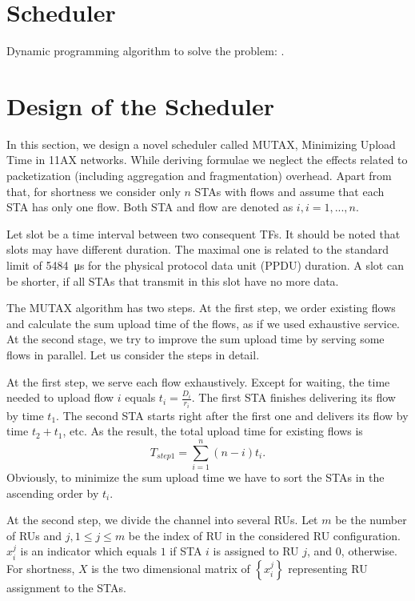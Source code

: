 \section{Scheduler}
Dynamic programming algorithm to solve the problem: \cite{bourgeois1971extension}.

\section{Design of the Scheduler}
\label{mutex}
In this section, we design a novel scheduler called MUTAX, Minimizing Upload Time in 11AX networks. While deriving formulae we neglect the effects related to packetization (including aggregation and fragmentation) overhead. Apart from that, for shortness we consider only $n$ STAs with flows and assume that each STA has only one flow. Both STA and flow are denoted as $i, i=1,...,n$.

Let slot be a time interval between two consequent TFs.
It should be noted that slots may have different duration.
The maximal one is related to the standard limit of \SI{5484}{\us} for the physical protocol data unit (PPDU) duration.
A slot can be shorter, if all STAs that transmit in this slot have no more data.

The MUTAX algorithm has two steps. At the first step, we order existing flows and calculate the sum upload time of the flows, as if we used exhaustive service.
At the second stage, we try to improve the sum upload time by serving some flows in parallel.
Let us consider the steps in detail.
  
At the first step, we serve each flow exhaustively.
Except for waiting, the time needed to upload flow $i$ equals $t_i = \frac{D_i}{r_{i}}$. %
The first STA finishes delivering its flow by time $t_1$.
The second STA starts right after the first one and delivers its flow by time $t_2 + t_1$, etc.
As the result, the total upload time for existing flows is
\begin{equation}
T_{step1} = \sum_{i = 1}^{n} \left(n - i\right) t_i. 
\end{equation}
Obviously, to minimize the sum upload time we have to sort the STAs in the ascending order by $t_i$.

At the second step, we divide the channel into several RUs.   
Let $m$ be the number of RUs and $j, 1\le j \le m$ be the index of RU in the considered RU configuration.  
$x_i^j$ is an indicator which equals $1$ if STA $i$ is assigned to RU $j$, and $0$, otherwise.
For shortness, $X$ is the two dimensional matrix of $\left\{x_i^j\right\}$ representing RU assignment to the STAs. 

